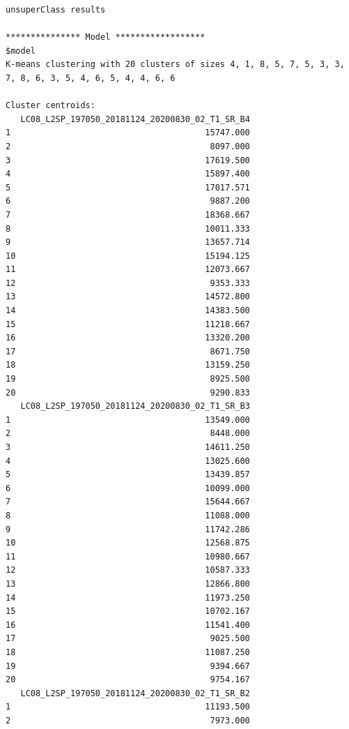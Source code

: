 \documentclass[12pt,a4paper,oneside]{article}
\begin{document}
\begin{scriptsize}
\begin{verbatim}
unsuperClass results

*************** Model ******************
$model
K-means clustering with 20 clusters of sizes 4, 1, 8, 5, 7, 5, 3, 3, 7, 8, 6, 3, 5, 4, 6, 5, 4, 4, 6, 6

Cluster centroids:
   LC08_L2SP_197050_20181124_20200830_02_T1_SR_B4
1                                       15747.000
2                                        8097.000
3                                       17619.500
4                                       15897.400
5                                       17017.571
6                                        9887.200
7                                       18368.667
8                                       10011.333
9                                       13657.714
10                                      15194.125
11                                      12073.667
12                                       9353.333
13                                      14572.800
14                                      14383.500
15                                      11218.667
16                                      13320.200
17                                       8671.750
18                                      13159.250
19                                       8925.500
20                                       9290.833
   LC08_L2SP_197050_20181124_20200830_02_T1_SR_B3
1                                       13549.000
2                                        8448.000
3                                       14611.250
4                                       13025.600
5                                       13439.857
6                                       10099.000
7                                       15644.667
8                                       11088.000
9                                       11742.286
10                                      12568.875
11                                      10980.667
12                                      10587.333
13                                      12866.800
14                                      11973.250
15                                      10702.167
16                                      11541.400
17                                       9025.500
18                                      11087.250
19                                       9394.667
20                                       9754.167
   LC08_L2SP_197050_20181124_20200830_02_T1_SR_B2
1                                       11193.500
2                                        7973.000

\end{verbatim}
\end{scriptsize}
\end{document}
